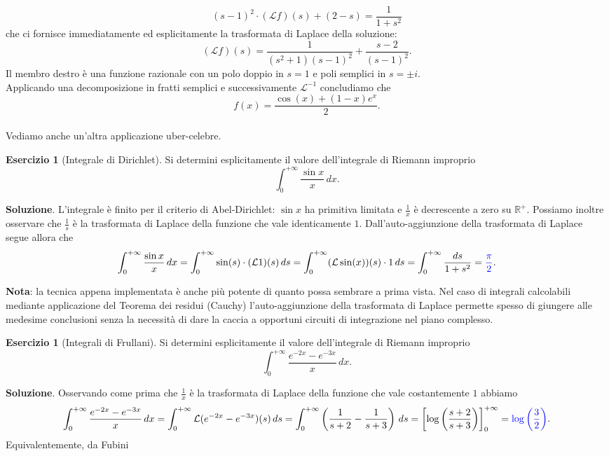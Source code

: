 \documentclass[a4paper,twoside]{article}
\newcommand{\R}{\mathbb{R}}
\theoremstyle{definition}
\newtheorem{ex}[theorem]{Esercizio}
\numberwithin{theorem}{section}
\begin{document}
$$ (s-1)^2\cdot(\mathcal{L}f)(s)+(2-s) = \frac{1}{1+s^2} $$
che ci fornisce immediatamente ed esplicitamente la trasformata di Laplace della soluzione:
$$ (\mathcal{L}f)(s) = \frac{1}{(s^2+1)(s-1)^2}+\frac{s-2}{(s-1)^2}. $$
Il membro destro è una funzione razionale con un polo doppio in $s=1$ e poli semplici in $s=\pm i$.\\ Applicando una decomposizione in fratti semplici e successivamente $\mathcal{L}^{-1}$ concludiamo che 
$$ f(x) = \frac{\cos(x)+(1-x)e^x}{2}. $$
\\
Vediamo anche un'altra applicazione uber-celebre.
\begin{ex}[Integrale di Dirichlet] Si determini esplicitamente il valore dell'integrale di Riemann improprio $$\int_{0}^{+\infty}\frac{\sin x}{x}\,dx.$$
\end{ex}
\textbf{Soluzione}. L'integrale è finito per il criterio di Abel-Dirichlet: $\sin x$ ha primitiva limitata e $\frac{1}{x}$ è decrescente a zero su $\R^+$. Possiamo inoltre osservare che $\frac{1}{s}$ è la trasformata di Laplace della funzione che vale identicamente $1$. Dall'auto-aggiunzione della trasformata di Laplace segue allora che 
$$ \int_{0}^{+\infty}\frac{\sin x}{x}\,dx = \int_{0}^{+\infty}\sin(s)\cdot(\mathcal{L} 1)(s)\,ds = \int_{0}^{+\infty}(\mathcal{L}\sin(x))(s)\cdot 1\,ds = \int_{0}^{+\infty}\frac{ds}{1+s^2}={\color{blue}\frac{\pi}{2}}. $$

\textbf{Nota}: la tecnica appena implementata è anche più potente di quanto possa sembrare a prima vista. Nel caso di integrali calcolabili mediante applicazione del Teorema dei residui (Cauchy) l'auto-aggiunzione della trasformata di Laplace permette spesso di giungere alle medesime conclusioni senza la necessità di dare la caccia a opportuni circuiti di integrazione nel piano complesso.\\

\begin{ex}[Integrali di Frullani] Si determini esplicitamente il valore dell'integrale di Riemann improprio 
$$ \int_{0}^{+\infty}\frac{e^{-2x}-e^{-3x}}{x}\,dx.$$ 
\end{ex}
\textbf{Soluzione}. Osservando come prima che $\frac{1}{x}$ è la trasformata di Laplace della funzione che vale costantemente $1$ abbiamo 
$$ \int_{0}^{+\infty}\frac{e^{-2x}-e^{-3x}}{x}\,dx = \int_{0}^{+\infty}\mathcal{L}(e^{-2x}-e^{-3x})(s)\,ds = \int_{0}^{+\infty}\left(\frac{1}{s+2}-\frac{1}{s+3}\right)\,ds=\left[\log\left(\frac{s+2}{s+3}\right)\right]_{0}^{+\infty}={\color{blue}\log\left(\frac{3}{2}\right)}. $$
Equivalentemente, da Fubini 
\end{document}
